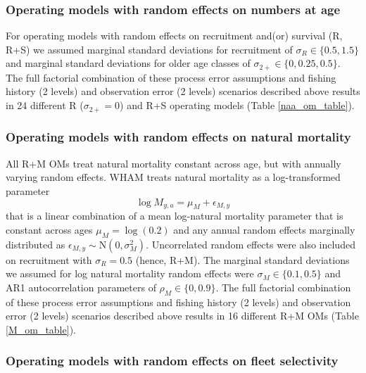 \documentclass[
  12pt,
]{article}
\begin{document}
\hypertarget{operating-models-with-random-effects-on-numbers-at-age}{%
\subsubsection*{Operating models with random effects on numbers at
age}\label{operating-models-with-random-effects-on-numbers-at-age}}

For operating models with random effects on recruitment and(or) survival
(R, R+S) we assumed marginal standard deviations for recruitment of
\(\sigma_R \in \{0.5,1.5\}\) and marginal standard deviations for older
age classes of \(\sigma_{2+} \in \{0,0.25, 0.5\}\). The full factorial
combination of these process error assumptions and fishing history (2
levels) and observation error (2 levels) scenarios described above
results in 24 different R (\(\sigma_{2+} = 0\)) and R+S operating models
(Table \ref{naa_om_table}).

\hypertarget{operating-models-with-random-effects-on-natural-mortality}{%
\subsubsection*{Operating models with random effects on natural
mortality}\label{operating-models-with-random-effects-on-natural-mortality}}

All R+M OMs treat natural mortality constant across age, but with
annually varying random effects. WHAM treats natural mortality as a
log-transformed parameter \[
\log M_{y,a} = \mu_{M} + \epsilon_{M,y}
\] that is a linear combination of a mean log-natural mortality
parameter that is constant across ages \(\mu_{M} = \log(0.2)\) and any
annual random effects marginally distributed as
\(\epsilon_{M,y} \sim \text{N}\left(0,\sigma_M^2\right)\). Uncorrelated
random effects were also included on recruitment with \(\sigma_R = 0.5\)
(hence, R+M). The marginal standard deviations we assumed for log
natural mortality random effects were \(\sigma_M \in \{0.1, 0.5\}\) and
AR1 autocorrelation parameters of \(\rho_M \in \{0,0.9\}\). The full
factorial combination of these process error assumptions and fishing
history (2 levels) and observation error (2 levels) scenarios described
above results in 16 different R+M OMs (Table \ref{M_om_table}).

\hypertarget{operating-models-with-random-effects-on-fleet-selectivity}{%
\subsubsection*{Operating models with random effects on fleet
selectivity}\label{operating-models-with-random-effects-on-fleet-selectivity}}
\end{document}
